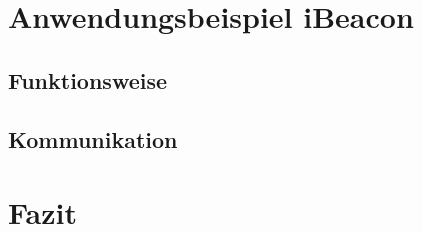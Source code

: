 \section{Anwendungsbeispiel iBeacon}
\label{s:ibeacon}

\subsection{Funktionsweise}
\label{ss:ibeacon:funktionsweise}

\subsection{Kommunikation}
\label{ss:ibeacon:kommunikation}

\section{Fazit}
\label{s:fazit}
